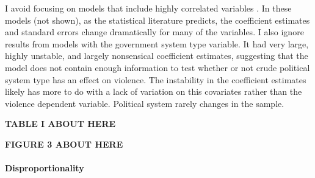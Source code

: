 \documentclass[a4paper]{article}\usepackage[]{graphicx}\usepackage[]{color}
\begin{document}
I avoid focusing on models that include highly correlated variables \citep[]{Achen2002, Schrodt2006}. In these models (not shown), as the statistical literature predicts, the coefficient estimates and standard errors change dramatically for many of the variables. I also ignore results from models with the government system type variable. It had very large, highly unstable, and largely nonsensical coefficient estimates, suggesting that the model does not contain enough information to test \citep{Babyak2004} whether or not crude political system type has an effect on violence. The instability in the coefficient estimates likely has more to do with a lack of variation on this covariates rather than the violence dependent variable. Political system rarely changes in the sample.

\vspace{0.5cm}

\textbf{TABLE I ABOUT HERE}

\vspace{0.5cm}


\vspace{0.5cm}

\textbf{FIGURE 3 ABOUT HERE}

\vspace{0.5cm}


\paragraph{Disproportionality}
\end{document}
